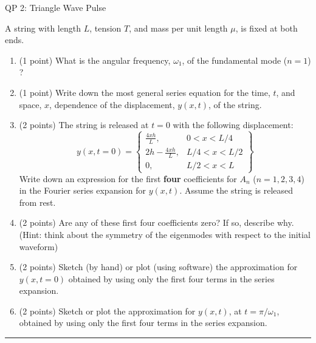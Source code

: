 \documentclass[12pt]{article}
\begin{document}
%
\begin{centering}
\LARGE{QP 2: Triangle Wave Pulse}
\end{centering}
\bigskip
\bigskip

A string with length $L$, tension $T$, and mass per unit length $\mu$,
is fixed at both ends.

\begin{enumerate}[label=(\alph*)]
\item (1 point) What is the angular frequency, $\omega_1$,
of the fundamental mode ($n = 1$) ?

\item (1 point) Write down the most general series equation for the time, $t$, and space, $x$, dependence of the displacement, $y(x,t)$, of the string.

\item (2 points) The string is released at $t = 0$ with the following displacement:
\[
y(x , t = 0) = \left.
\begin{cases}
\frac{4 x h}{L}, & 0 < x < L/4 \\
2 h - \frac{4 x h}{L}, & L/4 < x < L/2 \\
0, & L/2 < x < L
\end{cases}
\right\}
\]
Write down an expression for the first \textbf{four} coefficients for $A_n$ ($n = 1,2,3,4$) in the Fourier series expansion for $y(x,t)$. Assume the string is released from rest.

\item (2 points) Are any of these first four coefficients zero? If so, describe why. (Hint: think about the symmetry of the eigenmodes with respect to the initial waveform)

\item (2 points) Sketch (by hand) or plot (using software) the approximation for $y(x, t=0)$ obtained by using only the first four terms in the series expansion.

\item (2 points) Sketch or plot the approximation for $y(x,t)$,
at $t = \pi/\omega_1$, obtained by using only the first four terms in the series expansion.

\end{enumerate}
\bigskip
{\color{Sepia} \hrule}



\end{document}
